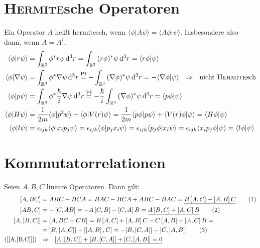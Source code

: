 \documentclass[a4paper,12pt]{article}
\newcommand\numberthis{\addtocounter{equation}{1}\tag{\theequation}}
\newcommand{\brak}{}
\newcommand{\intr}{}
\newcommand{\klam}{}
\begin{document}
\section{\textsc{Hermite}sche Operatoren}
Ein Operator $A$ heißt hermitesch, wenn $\brak\langle {\phi}| {A\psi}\rangle=\brak\langle {A\phi}| {\psi}\rangle$. Insbesondere also dann, wenn $A=A^\dagger$.
\begin{align*}
\brak\langle {\phi}| {r\psi}\rangle&=\intr\int_{\mathbb{R}^{3}}{\phi^\ast r\psi}\,\mathrm{d}^{3}r=\intr\int_{\mathbb{R}^{3}}{(r\phi)^\ast\psi}\,\mathrm{d}^{3}r=\brak\langle {r\phi}| {\psi}\rangle \\
\brak\langle {\phi}| {\nabla\psi}\rangle&=\intr\int_{\mathbb{R}^{3}}{\phi^\ast\nabla\psi}\,\mathrm{d}^{3}r\overset{\mathrm{PI}}{=}-\intr\int_{\mathbb{R}^{3}}{(\nabla\phi)^\ast\psi}\,\mathrm{d}^{3}r=-\brak\langle {\nabla\phi}| {\psi}\rangle\ \ \Rightarrow\ \ \mathrm{nicht\  \textsc{Hermite}sch} \\
\brak\langle {\phi}| {p\psi}\rangle&=\intr\int_{\mathbb{R}^{3}}{\phi^\ast \frac{\hbar}{i}\nabla\psi}\,\mathrm{d}^{3}r\overset{\mathrm{PI}}{=}-\frac{\hbar}{i}\intr\int_{\mathbb{R}^{3}}{(\nabla\phi)^\ast\psi}\,\mathrm{d}^{3}r=\brak\langle {p\phi}| {\psi}\rangle \\
\brak\langle {\phi}| {H\psi}\rangle&=\frac{1}{2m}\brak\langle {\phi}| {p^2\psi}\rangle+\brak\langle {\phi}| {V(r)\psi}\rangle=\frac{1}{2m}\brak\langle {p\phi}| {p\psi}\rangle+\brak\langle {V(r)\phi}| {\psi}\rangle=\brak\langle {H\phi}| {\psi}\rangle \\
\brak\langle {\phi}| {l\psi}\rangle&=\epsilon_{ijk}\brak\langle {\phi}| {x_ip_j\psi}\rangle=\epsilon_{ijk}\brak\langle {\phi}| {p_jx_i\psi}\rangle=\epsilon_{ijk}\brak\langle {p_j\phi}| {x_i\psi}\rangle=\epsilon_{ijk}\brak\langle {x_ip_j\phi}| {\psi}\rangle=\brak\langle {l\phi}| {\psi}\rangle
\end{align*}
\section{Kommutatorrelationen}
Seien $A,B,C$ lineare Operatoren. Dann gilt:
\begin{align*}
\klam\left[ {A,BC} \right]&=ABC-BCA=BAC-BCA+ABC-BAC=\underline{B\klam\left[ {A,C} \right]+\klam\left[ {A,B} \right]C} \numberthis\label{[A,BC]}\\
\klam\left[ {AB,C} \right]&=-\klam\left[ {C,AB} \right]=-A\klam\left[ {C,B} \right]-\klam\left[ {C,A} \right]B=\underline{A\klam\left[ {B,C} \right]+\klam\left[ {A,C} \right]B} \numberthis\label{[AB,C]} \\
\klam\left[ {A,\klam\left[ {B,C} \right]} \right]&=\klam\left[ {A,BC-CB} \right]=B\klam\left[ {A,C} \right]+\klam\left[ {A,B} \right]C-C\klam\left[ {A,B} \right]-\klam\left[ {A,C} \right]B= \\
&=\klam\left[ {B,\klam\left[ {A,C} \right]} \right]+\klam\left[ {\klam\left[ {A,B} \right], C} \right]=-[B,[C,A]]-[C,[A,B]] \numberthis\label{[A,[B,C]]} \\
(\ref{[A,[B,C]]})\ \ &\Rightarrow\ \ \underline{[A,[B,C]]+[B,[C,A]]+[C,[A,B]]=0}
\end{align*}
\end{document}
